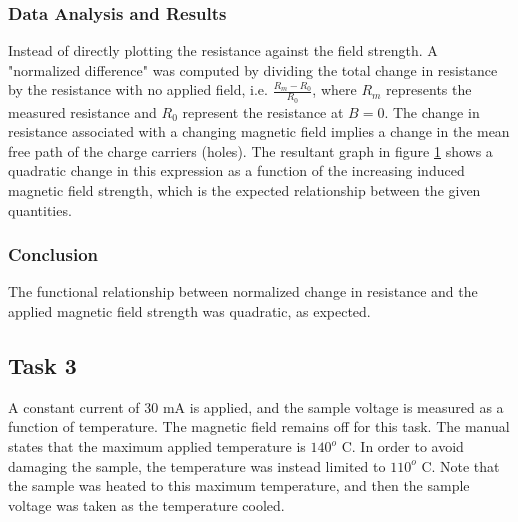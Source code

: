 \documentclass[a4paper]{article}
\begin{document}
\subsubsection{Data Analysis and Results}
\qq Instead of directly plotting the resistance against the field strength. A "normalized difference" was computed by dividing the total 
change in resistance by the resistance with no applied field, i.e. $\frac{R_m - R_0}{R_0}$, where $R_m$ represents the measured resistance and $R_0$ represent the resistance at $B=0$. The change in resistance associated with a changing magnetic field implies a change in the mean free path of the charge carriers (holes). The resultant graph in figure \ref{task22plot} shows a quadratic change in this expression as a function of the increasing induced magnetic field
strength, which is the expected relationship between the given quantities.

\begin{figure}[H]
\centering
\label{task22plot}
\end{figure}

\subsubsection{Conclusion}
The functional relationship between normalized change in resistance and the applied magnetic field strength was quadratic, as expected.

\subsection{Task 3}

\qq A constant current of 30 mA is applied, and the sample voltage is
measured as a function of temperature. The magnetic field
remains off for this task. The manual states that the maximum
applied temperature is $140^o$ C. In order to avoid damaging the sample, the temperature was instead limited to $110^o$ C. Note that the sample 
was heated to this maximum temperature, and then the sample voltage was taken as the temperature cooled.
\end{document}
